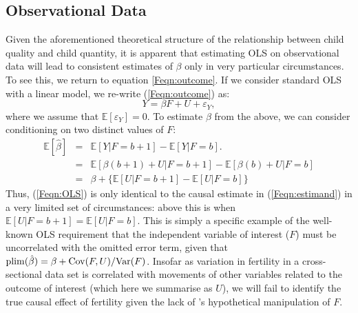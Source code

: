 \subsection{Observational Data}
Given the aforementioned theoretical structure of the relationship between 
child quality and child quantity, it is apparent that estimating OLS on 
observational data will lead to consistent estimates of $\beta$ only in very
particular circumstances. To see this, we return to equation \ref{Feqn:outcome}.
If we consider standard OLS with a linear model, we re-write 
(\ref{Feqn:outcome}) as:
\[
Y=\beta F + U + \varepsilon_Y,
\]
where we assume that $\mathbb{E}[\varepsilon_Y]=0$.  To estimate $\beta$ from
the above, we can consider conditioning on two distinct values of $F$:
\begin{eqnarray}
\mathbb{E}[\hat\beta] & = & \mathbb{E}[Y|F=b+1]-\mathbb{E}[Y|F=b]. \label{Feqn:OLS} \\
                      & = & \mathbb{E}[\beta(b+1)+U|F=b+1] - \mathbb{E}[\beta(b)+U|F=b] 
\nonumber \\
                      & = & \beta + \{\mathbb{E}[U|F=b+1] - \mathbb{E}[U|F=b]\} \nonumber
\end{eqnarray}
Thus, (\ref{Feqn:OLS}) is only identical to the causal estimate in 
(\ref{Feqn:estimand}) in a very limited set of circumstances: above this is when
$\mathbb{E}[U|F=b+1] = \mathbb{E}[U|F=b]$.  This is simply a specific example of 
the well-known OLS requirement that the independent variable of interest ($F$) 
must be uncorrelated with the omitted error term, given that 
$\operatorname{plim}(\hat\beta)=\beta+\mathrm{Cov}(F,U)/\mathrm{Var}(F)$.  Insofar as variation in fertility
in a cross-sectional data set is correlated with movements of other variables
related to the outcome of interest (which here we summarise as $U$), we will fail 
to identify the true causal effect of fertility given the lack of 
\citeauthor{Haavelmo1943}'s hypothetical manipulation of $F$. 

